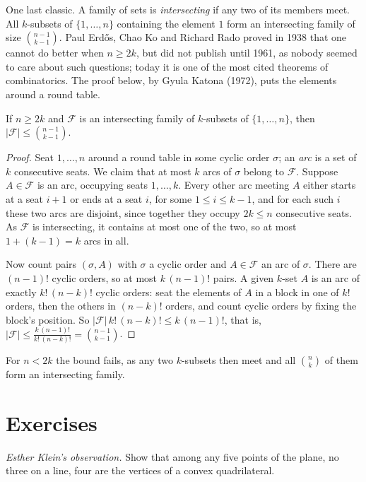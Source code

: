 One last classic. A family of sets is \emph{intersecting} if any two of its members meet. All $k$-subsets of $\{1,\dots,n\}$ containing
the element $1$ form an intersecting family of size $\binom{n-1}{k-1}$. Paul Erd\H os, Chao Ko and Richard Rado proved in 1938 that one
cannot do better when $n\ge2k$, but did not publish until 1961, as nobody seemed to care about such questions; today it is
one of the most cited theorems of combinatorics. The proof below, by Gyula Katona (1972), puts the elements around a
round table.

\begin{theorem}\label{orders:thm:ekr}
If $n\ge2k$ and $\mathcal F$ is an intersecting family of $k$-subsets of $\{1,\dots,n\}$, then $|\mathcal F|\le\binom{n-1}{k-1}$.
\end{theorem}
\begin{proof}
Seat $1,\dots,n$ around a round table in some cyclic order $\sigma$; an \emph{arc} is a set of $k$ consecutive seats. We claim that at most $k$ arcs
of $\sigma$ belong to $\mathcal F$. Suppose $A\in\mathcal F$ is an arc, occupying seats $1,\dots,k$. Every other arc meeting $A$ either starts at a seat
$i+1$ or ends at a seat $i$, for some $1\le i\le k-1$, and for each such $i$ these two arcs are disjoint, since together they occupy
$2k\le n$ consecutive seats. As $\mathcal F$ is intersecting, it contains at most one of the two, so at most $1+(k-1)=k$ arcs in all.

Now count pairs $(\sigma,A)$ with $\sigma$ a cyclic order and $A\in\mathcal F$ an arc of $\sigma$. There are $(n-1)!$ cyclic orders, so at most $k\,(n-1)!$ pairs.
A given $k$-set $A$ is an arc of exactly $k!\,(n-k)!$ cyclic orders: seat the elements of $A$ in a block in one of $k!$ orders, then the
others in $(n-k)!$ orders, and count cyclic orders by fixing the block's position. So $|\mathcal F|\,k!\,(n-k)!\le k\,(n-1)!$, that is,
$|\mathcal F|\le\frac{k\,(n-1)!}{k!\,(n-k)!}=\binom{n-1}{k-1}$.
\end{proof}

For $n<2k$ the bound fails, as any two $k$-subsets then meet and all $\binom nk$ of them form an intersecting family.

\section{Exercises}

\begin{exercise}[$\star$]\label{orders:ex:klein}
\emph{Esther Klein's observation.} Show that among any five points of the plane, no three on a line, four are the vertices of
a convex quadrilateral.
\end{exercise}

